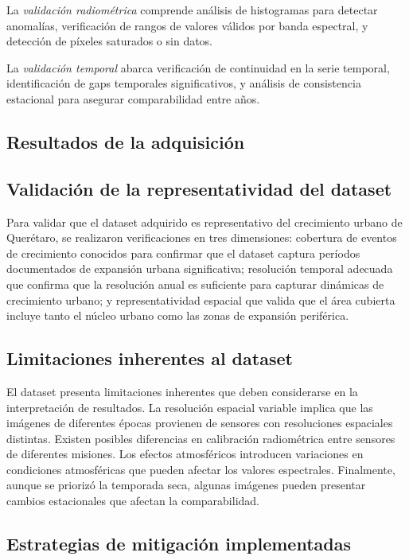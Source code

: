 La \textit{validación radiométrica} comprende análisis de histogramas para detectar anomalías, verificación de rangos de valores válidos por banda espectral, y detección de píxeles saturados o sin datos.

La \textit{validación temporal} abarca verificación de continuidad en la serie temporal, identificación de gaps temporales significativos, y análisis de consistencia estacional para asegurar comparabilidad entre años.

\subsection{Resultados de la adquisición}

\subsection{Validación de la representatividad del dataset}

Para validar que el dataset adquirido es representativo del crecimiento urbano de Querétaro, se realizaron verificaciones en tres dimensiones: cobertura de eventos de crecimiento conocidos para confirmar que el dataset captura períodos documentados de expansión urbana significativa; resolución temporal adecuada que confirma que la resolución anual es suficiente para capturar dinámicas de crecimiento urbano; y representatividad espacial que valida que el área cubierta incluye tanto el núcleo urbano como las zonas de expansión periférica.

\subsection{Limitaciones inherentes al dataset}

El dataset presenta limitaciones inherentes que deben considerarse en la interpretación de resultados. La resolución espacial variable implica que las imágenes de diferentes épocas provienen de sensores con resoluciones espaciales distintas. Existen posibles diferencias en calibración radiométrica entre sensores de diferentes misiones. Los efectos atmosféricos introducen variaciones en condiciones atmosféricas que pueden afectar los valores espectrales. Finalmente, aunque se priorizó la temporada seca, algunas imágenes pueden presentar cambios estacionales que afectan la comparabilidad.

\subsection{Estrategias de mitigación implementadas}

